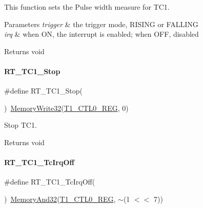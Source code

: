 This function sets the Pulse width measure for T\+C1. 


\begin{DoxyParams}{Parameters}
{\em trigger} & the trigger mode, R\+I\+S\+I\+NG or F\+A\+L\+L\+I\+NG \\
\hline
{\em irq} & when ON, the interrupt is enabled; when O\+FF, disabled \\
\hline
\end{DoxyParams}
\begin{DoxyReturn}{Returns}
void 
\end{DoxyReturn}
\mbox{\label{a00080_ade1093a6b28016a59b5e5b0c2733ab2c}} 
\paragraph{\texorpdfstring{R\+T\+\_\+\+T\+C1\+\_\+\+Stop}{RT\_TC1\_Stop}}
{\footnotesize\ttfamily \#define R\+T\+\_\+\+T\+C1\+\_\+\+Stop(\begin{DoxyParamCaption}{ }\end{DoxyParamCaption})~\mbox{\hyperlink{a00026_a6b9732365b12e48ddb89fe1028b975b0}{Memory\+Write32}}(\mbox{\hyperlink{a00026_a55600694c3c73a1019f78d306f474fa1}{T1\+\_\+\+C\+T\+L0\+\_\+\+R\+EG}}, 0)}



Stop T\+C1. 

\begin{DoxyReturn}{Returns}
void 
\end{DoxyReturn}
\mbox{\label{a00080_ad8775d32f1b8cb982c2abf045e3b6b95}} 
\paragraph{\texorpdfstring{R\+T\+\_\+\+T\+C1\+\_\+\+Tc\+Irq\+Off}{RT\_TC1\_TcIrqOff}}
{\footnotesize\ttfamily \#define R\+T\+\_\+\+T\+C1\+\_\+\+Tc\+Irq\+Off(\begin{DoxyParamCaption}{ }\end{DoxyParamCaption})~\mbox{\hyperlink{a00026_ad87cedffcaadc51db22594fce55173d4}{Memory\+And32}}(\mbox{\hyperlink{a00026_a55600694c3c73a1019f78d306f474fa1}{T1\+\_\+\+C\+T\+L0\+\_\+\+R\+EG}}, $\sim$(1 $<$$<$ 7))}



